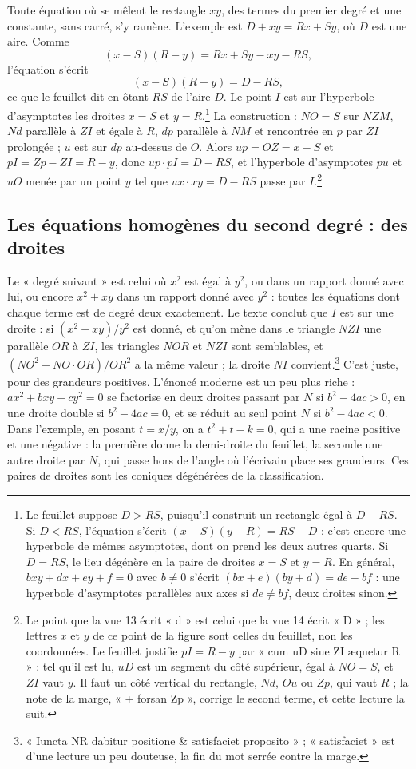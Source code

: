 \documentclass[11pt,a4paper]{article}
\begin{document}
Toute équation où se mêlent le rectangle $xy$, des termes du premier degré et
une constante, sans carré, s'y ramène. L'exemple est $D + xy = Rx + Sy$, où $D$
est une aire. Comme
\[ (x - S)(R - y) = Rx + Sy - xy - RS, \]
l'équation s'écrit
\[ (x - S)(R - y) = D - RS , \]
ce que le feuillet dit en ôtant $RS$ de l'aire $D$. Le point $I$ est sur
l'hyperbole d'asymptotes les droites $x = S$ et $y = R$.\footnote{Le feuillet
suppose $D > RS$, puisqu'il construit un rectangle égal à $D - RS$. Si
$D < RS$, l'équation s'écrit $(x-S)(y-R) = RS - D$ : c'est encore une
hyperbole de mêmes asymptotes, dont on prend les deux autres quarts. Si
$D = RS$, le lieu dégénère en la paire de droites $x = S$ et $y = R$. En
général, $bxy + dx + ey + f = 0$ avec $b \neq 0$ s'écrit
$(bx + e)(by + d) = de - bf$ : une hyperbole d'asymptotes parallèles aux axes
si $de \neq bf$, deux droites sinon.} La construction : $NO = S$ sur $NZM$, $Nd$
parallèle à $ZI$ et égale à $R$, $dp$ parallèle à $NM$ et rencontrée en $p$ par
$ZI$ prolongée ; $u$ est sur $dp$ au-dessus de $O$. Alors $up = OZ = x - S$ et
$pI = Zp - ZI = R - y$, donc $up \cdot pI = D - RS$, et l'hyperbole
d'asymptotes $pu$ et $uO$ menée par un point $y$ tel que $ux\cdot xy = D - RS$
passe par $I$.\footnote{Le point que la vue 13 écrit « d » est celui que la vue
14 écrit « D » ; les lettres $x$ et $y$ de ce point de la figure sont celles
du feuillet, non les coordonnées. Le feuillet justifie $pI = R - y$ par « cum
uD siue ZI æquetur R » : tel qu'il est lu, $uD$ est un segment du côté
supérieur, égal à $NO = S$, et $ZI$ vaut $y$. Il faut un côté vertical du
rectangle, $Nd$, $Ou$ ou $Zp$, qui vaut $R$ ; la note de la marge, « + forsan
Zp », corrige le second terme, et cette lecture la suit.}

\subsection*{Les équations homogènes du second degré : des droites}

Le « degré suivant » est celui où $x^2$ est égal à $y^2$, ou dans un rapport
donné avec lui, ou encore $x^2 + xy$ dans un rapport donné avec $y^2$ : toutes
les équations dont chaque terme est de degré deux exactement. Le texte conclut
que $I$ est sur une droite : si $(x^2 + xy)/y^2$ est donné, et qu'on mène dans
le triangle $NZI$ une parallèle $OR$ à $ZI$, les triangles $NOR$ et $NZI$ sont
semblables, et $(NO^2 + NO\cdot OR)/OR^2$ a la même valeur ; la droite $NI$
convient.\footnote{« Iuncta NR dabitur positione \& satisfaciet proposito » ;
« satisfaciet » est d'une lecture un peu douteuse, la fin du mot serrée contre
la marge.} C'est juste, pour des grandeurs positives. L'énoncé moderne est un
peu plus riche : $ax^2 + bxy + cy^2 = 0$ se factorise en deux droites passant
par $N$ si $b^2 - 4ac > 0$, en une droite double si $b^2 - 4ac = 0$, et se
réduit au seul point $N$ si $b^2 - 4ac < 0$. Dans l'exemple, en posant
$t = x/y$, on a $t^2 + t - k = 0$, qui a une racine positive et une négative :
la première donne la demi-droite du feuillet, la seconde une autre droite par
$N$, qui passe hors de l'angle où l'écrivain place ses grandeurs. Ces paires de
droites sont les coniques dégénérées de la classification.
\end{document}
